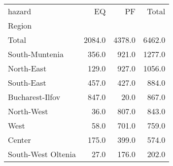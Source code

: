\begin{tabular}{lrrr}
\toprule
hazard &      EQ &      PF &   Total \\
Region             &         &         &         \\
\midrule
Total              &  2084.0 &  4378.0 &  6462.0 \\
South-Muntenia     &   356.0 &   921.0 &  1277.0 \\
North-East         &   129.0 &   927.0 &  1056.0 \\
South-East         &   457.0 &   427.0 &   884.0 \\
Bucharest-Ilfov    &   847.0 &    20.0 &   867.0 \\
North-West         &    36.0 &   807.0 &   843.0 \\
West               &    58.0 &   701.0 &   759.0 \\
Center             &   175.0 &   399.0 &   574.0 \\
South-West Oltenia &    27.0 &   176.0 &   202.0 \\
\bottomrule
\end{tabular}
